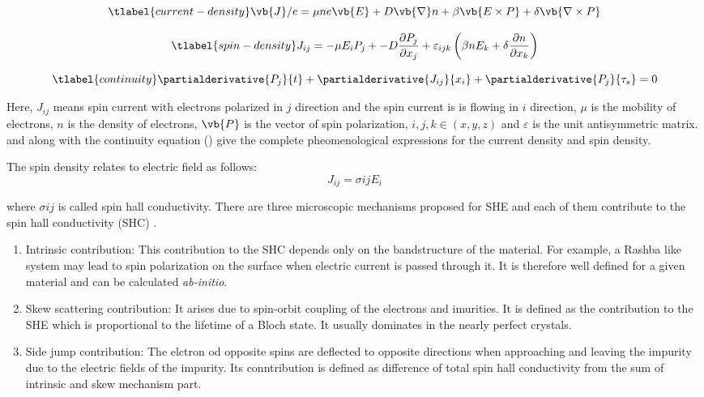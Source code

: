 \begin{equation}
    \tlabel{current-density}
    \vb{J}/e = \mu n e\vb{E} + D \vb{\nabla} n + \beta \vb{E \times P} + 
    \delta \vb{\nabla \times P}
\end{equation}

\begin{equation}
    \tlabel{spin-density}
    J_{ij} = - \mu E_{i} P_{j} + -D \frac{\partial P_{j}}{\partial x_{j}} + 
    \varepsilon_{ijk} \left(\beta n E_{k} + \delta \frac{\partial n}{\partial x_{k}}\right)
\end{equation}

\begin{equation}
    \tlabel{continuity}
    \partialderivative{P_{j}}{t} + \partialderivative{J_{ij}}{x_{i}} + 
    \partialderivative{P_{j}}{\tau_{s}} = 0
\end{equation}

Here, $J_{ij}$ means spin current with electrons polarized in $j$ direction and the spin current is
is flowing in $i$ direction, $\mu$ is the mobility of electrons, $n$ is the density of electrons, 
$\vb{P}$ is the vector of spin polarization, $i, j, k \in (x, y, z)$ and $\varepsilon$ is the 
unit antisymmetric matrix.  and  along with the continuity
equation () give the complete pheomenological expressions for the current density and 
spin density.

The spin density relates to electric field as follows:
\begin{equation}
    J_{ij} = \sigma{ij} E_{i}
\end{equation}

where $\sigma{ij}$ is called spin hall conductivity. There are three microscopic mechanisms 
proposed for SHE and each of them contribute to the spin hall conductivity (SHC) \cite{Hirsch1999, Dyakonov2009, Sinova2015}.

\begin{enumerate}
    \item Intrinsic contribution: This contribution to the SHC depends only on the bandstructure
    of the material. For example, a Rashba like system may lead to spin polarization on the surface 
    when electric current is passed through it. It is therefore well defined for a given material
    and can be calculated \textit{ab-initio}.
    \item Skew scattering contribution: It arises due to spin-orbit coupling of the electrons and imurities.
    It is defined as the contribution to the SHE which is proportional to the lifetime of a Bloch state. 
    It usually dominates in the  nearly perfect crystals.
    \item Side jump contribution: The elctron od opposite spins are deflected to opposite directions
    when approaching and leaving the impurity due to the electric fields of the impurity. Its 
    conntribution is defined as difference of total spin hall conductivity from the sum of intrinsic 
    and skew mechanism part.
\end{enumerate}

